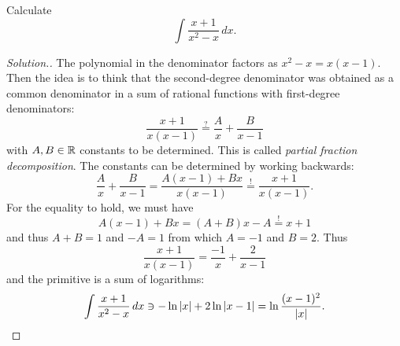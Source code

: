 \begin{example}
Calculate 
\[
  \int \frac{x+1}{x^2-x}\, dx.
\]
\end{example}
\begin{proof}[Solution.]
The polynomial in the denominator factors as $x^2 -x = x (x-1)$. 
Then the idea is to think that the second-degree denominator was obtained as a
common denominator in a sum of rational functions with first-degree
denominators:
\begin{equation}\label{eq:541177}
  \frac{x+1}{x(x-1)} \stackrel?= \frac{A}{x} + \frac{B}{x-1}  
\end{equation}
with $A,B\in {\mathbb R}$ constants to be determined. 
This is called \emph{partial fraction decomposition}.
%
The constants can be determined by working backwards:
\[
  \frac{A}{x} + \frac{B}{x-1}    
  = \frac{A(x-1) + Bx}{x(x-1)} \stackrel!= \frac{x+1}{x(x-1)}.
\]
For the equality to hold, we must have 
\[
  A(x-1) + Bx = (A+B)x - A \stackrel!= x+1  
\]
and thus $A+B = 1$ and $-A=1$ from which $A=-1$ and $B=2$.
%
%
Thus 
\[
  \frac{x+1}{x(x-1)} = \frac{-1}{x} + \frac{2}{x-1}  
\]
and the primitive is a sum of logarithms:
\[
  \int \frac{x+1}{x^2-x}\, dx
  \ni -\ln{\left|x\right|} + 2 \ln {\left|x-1\right|} 
  = \ln \frac{(x-1)^2}{{\left|x\right|}}.
\]
\end{proof}


